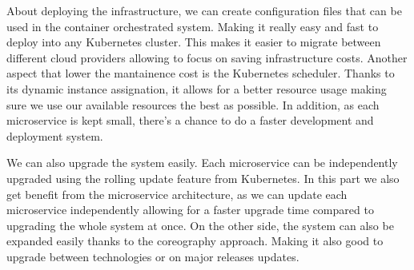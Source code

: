 About deploying the infrastructure, we can create configuration files that can be used in the container orchestrated system. Making it really easy and fast to deploy into any Kubernetes cluster. This makes it easier to migrate between different cloud providers allowing to focus on saving infrastructure costs. Another aspect that lower the mantainence cost is the Kubernetes scheduler. Thanks to its dynamic instance assignation, it allows for a better resource usage making sure we use our available resources the best as possible. In addition, as each microservice is kept small, there's a chance to do a faster development and deployment system.

We can also upgrade the system easily. Each microservice can be independently upgraded using the rolling update feature from Kubernetes. In this part we also get benefit from the microservice architecture, as we can update each microservice independently allowing for a faster upgrade time compared to upgrading the whole system at once. On the other side, the system can also be expanded easily thanks to the coreography approach. Making it also good to upgrade between technologies or on major releases updates.

